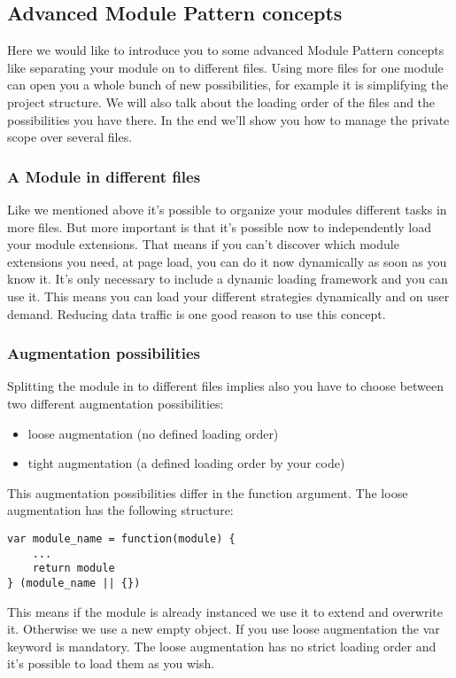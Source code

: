 \documentclass{bioinfo}
\begin{document}
\subsection{Advanced Module Pattern concepts}
Here we would like to introduce you to some advanced Module Pattern concepts like separating your module on to different files.
Using more files for one module can open you a whole bunch of new possibilities, for example it is simplifying the project structure.
We will also talk about the loading order of the files and the possibilities you have there.
In the end we'll show you how to manage the private scope over several files.

\subsubsection{A Module in different files}
Like we mentioned above it's possible to organize your modules different tasks in more files.
But more important is that it's possible now to independently load your module
extensions. That means if you can't discover which module extensions you need, at page load,
you can do it now dynamically as soon as you know it. It's only necessary to
include a dynamic loading framework and you can use it. This means you can load your different
strategies dynamically and on user demand. Reducing data traffic is one good reason to use this
concept.

\subsubsection{Augmentation possibilities}
Splitting the module in to different files implies also you have to choose between two different
augmentation possibilities:
\begin{itemize}
    \item loose augmentation (no defined loading order)
    \item tight augmentation (a defined loading order by your code)
\end{itemize}
This augmentation possibilities differ in the function argument.
The loose augmentation has the following structure:

\begin{lstlisting}
var module_name = function(module) {
    ...
    return module
} (module_name || {})
\end{lstlisting}

This means if the module is already instanced we use it to extend and overwrite it.
Otherwise we use a new empty object. If you use loose augmentation the var keyword
is mandatory. The loose augmentation has no strict loading order and it's possible to load them
as you wish. \vspace{\baselineskip}
\end{document}
